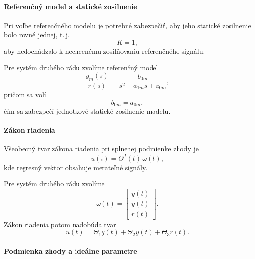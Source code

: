 \paragraph{Referenčný model a statické zosilnenie}

Pri voľbe referenčného modelu je potrebné zabezpečiť,
aby jeho statické zosilnenie bolo rovné jednej,
t.\,j.
\[
K = 1,
\]
aby nedochádzalo k nechcenému zosilňovaniu referenčného signálu.

Pre systém druhého rádu zvolíme referenčný model
\begin{equation}
	\frac{y_m(s)}{r(s)} =
	\frac{b_{0m}}{s^2 + a_{1m}s + a_{0m}},
	\label{eq:mrac_ref_model}
\end{equation}
pričom sa volí
\begin{equation}
	b_{0m} = a_{0m},
\end{equation}
čím sa zabezpečí jednotkové statické zosilnenie modelu.

\paragraph{Zákon riadenia}
Všeobecný tvar zákona riadenia pri splnenej podmienke zhody je
\begin{equation}
	u(t) = \Theta^T(t)\,\omega(t),
	\label{eq:mrac_general_control}
\end{equation}
kde regresný vektor obsahuje merateľné signály.

Pre systém druhého rádu zvolíme
\begin{equation}
	\omega(t) =
	\begin{bmatrix}
		y(t) \\
		\dot{y}(t) \\
		r(t)
	\end{bmatrix}.
\end{equation}
Zákon riadenia potom nadobúda tvar
\begin{equation}
	u(t) = \Theta_1 y(t) + \Theta_2 \dot{y}(t) + \Theta_3 r(t).
	\label{eq:mrac_control_law}
\end{equation}

\paragraph{Podmienka zhody a ideálne parametre}


